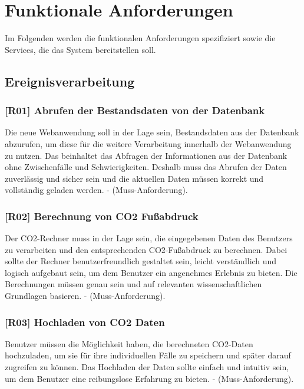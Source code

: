 \section{Funktionale Anforderungen}
\label{chapter:3-section:funktionale-anforderungen}

Im Folgenden werden die funktionalen Anforderungen spezifiziert sowie die Services, die das System bereitstellen soll.

\subsection{Ereignisverarbeitung}

\subsubsection{[R01] Abrufen der Bestandsdaten von der Datenbank}

Die neue Webanwendung soll in der Lage sein, Bestandsdaten aus der Datenbank abzurufen, um diese für die weitere Verarbeitung innerhalb der Webanwendung zu nutzen.
Das beinhaltet das Abfragen der Informationen aus der Datenbank ohne Zwischenfälle und Schwierigkeiten.
Deshalb muss das Abrufen der Daten zuverlässig und sicher sein und die aktuellen Daten müssen korrekt und vollständig geladen werden. - (Muss-Anforderung).

\subsubsection{[R02] Berechnung von CO2 Fußabdruck}

Der CO2-Rechner muss in der Lage sein, die eingegebenen Daten des Benutzers zu verarbeiten und den entsprechenden CO2-Fußabdruck zu berechnen. Dabei sollte der Rechner benutzerfreundlich gestaltet sein, leicht verständlich und logisch aufgebaut sein, um dem Benutzer ein angenehmes Erlebnis zu bieten. Die Berechnungen müssen genau sein und auf relevanten wissenschaftlichen Grundlagen basieren. - (Muss-Anforderung).

\subsubsection{[R03] Hochladen von CO2 Daten}

Benutzer müssen die Möglichkeit haben, die berechneten CO2-Daten hochzuladen, um sie für ihre individuellen Fälle zu speichern und später darauf zugreifen zu können. Das Hochladen der Daten sollte einfach und intuitiv sein, um dem Benutzer eine reibungslose Erfahrung zu bieten. - (Muss-Anforderung).

